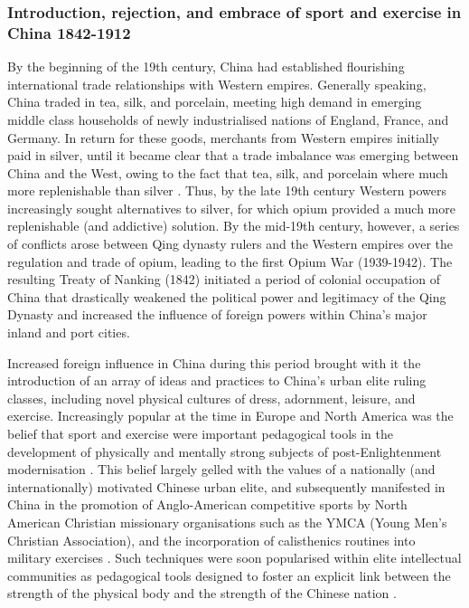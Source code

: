 {  \subsubsection{Introduction, rejection, and embrace of sport and exercise in China 1842-1912}
By the beginning of the 19th century, China had established flourishing international trade relationships with Western empires.  Generally speaking, China traded in tea, silk, and porcelain, meeting high demand in emerging middle class households of newly industrialised nations of England, France, and Germany.  In return for these goods,   merchants from Western empires initially paid in silver, until it became clear that a trade imbalance was emerging between China and the West, owing to the fact that tea, silk, and porcelain where much more replenishable than silver \citep{Fay2005}.  Thus, by the late 19th century Western powers increasingly sought alternatives to silver, for which opium provided a much more replenishable (and addictive) solution.  By the mid-19th century, however, a series of conflicts arose between Qing dynasty rulers and the Western empires over the regulation and trade of opium, leading to the first Opium War (1939-1942).  The resulting Treaty of Nanking (1842) initiated a period of colonial occupation of China that drastically weakened the political power and legitimacy of the Qing Dynasty and increased the influence of foreign powers within China's major inland and port cities.

Increased foreign influence in China during this period brought with it the introduction of an array of ideas and practices to China's urban elite ruling classes, including novel physical cultures of dress, adornment, leisure, and exercise.  Increasingly popular at the time in Europe and North America was the belief that sport and exercise were important pedagogical tools in the development of physically and mentally strong subjects of post-Enlightenment modernisation \citep{Elias1986}.  This belief largely gelled with the values of a nationally (and internationally) motivated Chinese urban elite, and subsequently manifested in China in the promotion of Anglo-American competitive sports by North American Christian missionary organisations such as the YMCA (Young Men’s Christian Association), and the incorporation of calisthenics routines into military exercises \citep[240]{Morris2004}.  Such techniques were soon popularised within elite intellectual communities as pedagogical tools designed to foster an explicit link between the strength of the physical body and the strength of the Chinese nation \cites[32]{Morris2004}[49]{Brownell1995}.

}
